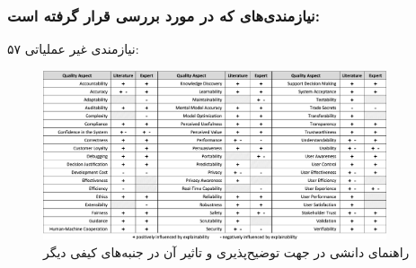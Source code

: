 \documentclass[10pt, a4paper]{beamer}
\begin{document}
\begin{frame}
    \frametitle{نیازمندی‌های  که در  مورد بررسی قرار گرفته است:}
    ۵۷ نیازمندی غیر عملیاتی:

    \begin{figure}[H]
        \centering
    \includegraphics[width=0.9\textwidth]{images/knowledge_catalogue.png}
        \caption{راهنمای دانشی در جهت توضیح‌پذیری و تاثیر آن در جنبه‌های کیفی
        دیگر}
        \label{fig:slrOrder}
    \end{figure}
\end{frame}
\end{document}
